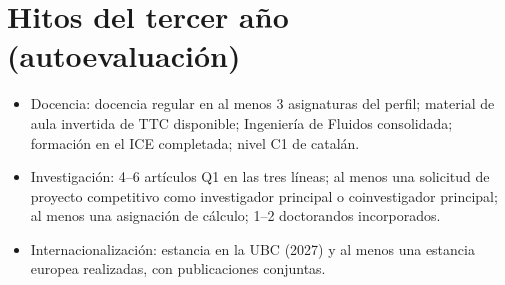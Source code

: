 \documentclass[11pt]{article}
\begin{document}
\section{Hitos del tercer año (autoevaluación)}
\begin{itemize}
\item Docencia: docencia regular en al menos 3 asignaturas del perfil; material de aula
invertida de TTC disponible; Ingeniería de Fluidos consolidada; formación en el ICE
completada; nivel C1 de catalán.
\item Investigación: 4--6 artículos Q1 en las tres líneas; al menos una solicitud de
proyecto competitivo como investigador principal o coinvestigador principal; al menos una
asignación de cálculo; 1--2 doctorandos incorporados.
\item Internacionalización: estancia en la UBC (2027) y al menos una estancia europea
realizadas, con publicaciones conjuntas.
\end{itemize}
\end{document}
